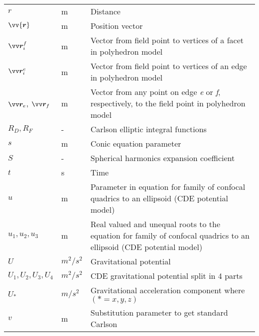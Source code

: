 \begin{longtable}[l]{p{100pt} p{70pt} p{150pt}}
    $r$              & m                & Distance                                          \\
    $\vv{\bm{r}}$    & m                & Position vector                                   \\
    $\bvector{r}_i^f$ & m               & Vector from field point to vertices of a facet
                                          in polyhedron model                               \\
    $\bvector{r}_i^e$ & m               & Vector from field point to vertices of an edge
                                          in polyhedron model                               \\
    $\bvector{r}_e$, $\bvector{r}_f$ & m & Vector from any point on edge \textit{e}
                                           or \textit{f}, respectively, to the field point
                                           in polyhedron model                              \\
    $R_D, R_F$       & -                & Carlson elliptic integral functions               \\
    $s$              & m                & Conic equation parameter                          \\
    $S$              & -                & Spherical harmonics expansion coefficient         \\
    $t$              & s                & Time                                              \\
    $u$              & m                & Parameter in equation for family of confocal
                                          quadrics to an ellipsoid (CDE potential model)    \\
    $u_1, u_2, u_3$  & m                & Real valued and unequal roots to the equation for
                                          family of confocal quadrics to an ellipsoid (CDE potential model)                                  \\
    $U$              & $m^2/s^2$        & Gravitational potential                           \\
    $U_1, U_2, U_3, U_4$ & $m^2/s^2$    & CDE gravitational potential split in 4 parts      \\
    $U_\ast$         & $m/s^2$          & Gravitational acceleration component
                                          where $(\ast=x,y,z)$                              \\
    $v$              & m                & Substitution parameter to get standard Carlson

\end{longtable}
